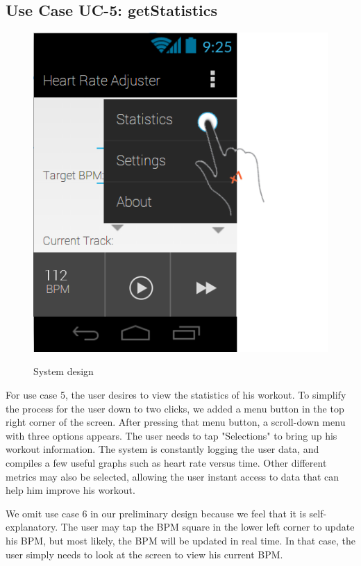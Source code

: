 \documentclass[letterpaper,english, 12pt]{scrreprt}
\begin{document}
\subsection{Use Case UC-5: getStatistics}

\begin{figure}[H]
	\centering
	\includegraphics{img/Prelim_Design/PrelimDesign_4.png}\\
	\caption{System design}
\end{figure}

For use case 5, the user desires to view the statistics of his workout. To simplify the process for the user down to two clicks, we added a menu button in the top right corner of the screen. After pressing that menu button, a scroll-down menu with three options appears. The user needs to tap "Selections" to bring up his workout information. The system is constantly logging the user data, and compiles a few useful graphs such as heart rate versus time. Other different metrics may also be selected, allowing the user instant access to data that can help him improve his workout. 

We omit use case 6 in our preliminary design because we feel that it is self-explanatory. The user may tap the BPM square in the lower left corner to update his BPM, but most likely, the BPM will be updated in real time. In that case, the user simply needs to look at the screen to view his current BPM.
\end{document}
